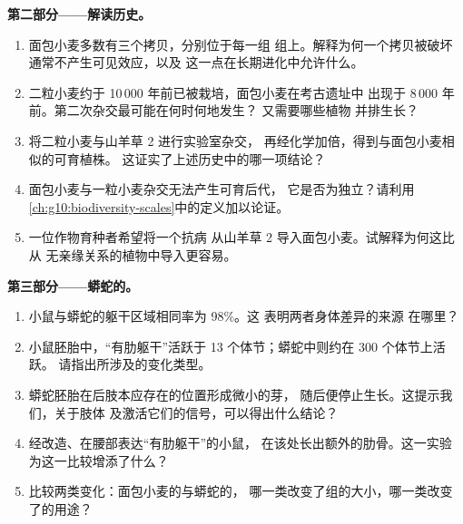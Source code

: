 \begin{problem}
\medskip
\noindent\textbf{第二部分——解读历史。}
\begin{enumerate}[resume]
  \item 面包小麦多数有三个拷贝，分别位于每一组
        组上。解释为何一个拷贝被破坏通常不产生可见效应，以及
        这一点在长期进化中允许什么。
  \item 二粒小麦约于 10\,000 年前已被栽培，面包小麦在考古遗址中
        出现于 8\,000 年前。第二次杂交最可能在何时何地发生？
        又需要哪些植物
        并排生长？
  \item 将二粒小麦与山羊草 2 进行实验室杂交，
        再经化学加倍，得到与面包小麦相似的可育植株。
        这证实了上述历史中的哪一项结论？
  \item 面包小麦与一粒小麦杂交无法产生可育后代，
        它是否为独立？请利用
        \cref{ch:g10:biodiversity-scales}中的定义加以论证。
  \item 一位作物育种者希望将一个抗病
        从山羊草 2 导入面包小麦。试解释为何这比从
        无亲缘关系的植物中导入更容易。
\end{enumerate}

\medskip
\noindent\textbf{第三部分——蟒蛇的。}
\begin{enumerate}[resume]
  \item 小鼠与蟒蛇的躯干区域相同率为 98\%。这
        表明两者身体差异的来源
        在哪里？
  \item 小鼠胚胎中，“有肋躯干”活跃于 13
        个体节；蟒蛇中则约在 300 个体节上活跃。
        请指出所涉及的变化类型。
  \item 蟒蛇胚胎在后肢本应存在的位置形成微小的芽，
        随后便停止生长。这提示我们，关于肢体
        及激活它们的信号，可以得出什么结论？
  \item 经改造、在腰部表达“有肋躯干”的小鼠，
        在该处长出额外的肋骨。这一实验
        为这一比较增添了什么？
  \item 比较两类变化：面包小麦的与蟒蛇的，
        哪一类改变了组的大小，哪一类改变了的用途？
\end{enumerate}


\end{problem}

